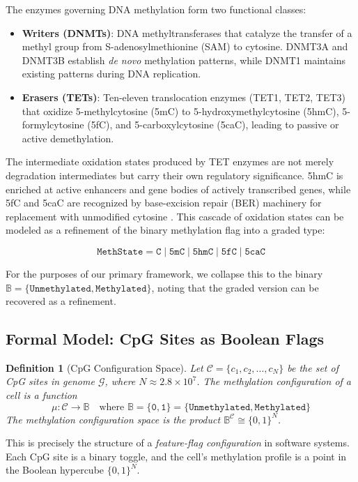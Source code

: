 \documentclass[12pt,a4paper]{article}
\newtheorem{definition}[theorem]{Definition}
\newcommand{\Meth}{\texttt{Methylated}}
\newcommand{\Unmeth}{\texttt{Unmethylated}}
\begin{document}
The enzymes governing DNA methylation form two functional classes:
\begin{itemize}
    \item \textbf{Writers (DNMTs)}: DNA methyltransferases that catalyze the transfer of a methyl group from S-adenosylmethionine (SAM) to cytosine. DNMT3A and DNMT3B establish \emph{de novo} methylation patterns, while DNMT1 maintains existing patterns during DNA replication.
    \item \textbf{Erasers (TETs)}: Ten-eleven translocation enzymes (TET1, TET2, TET3) that oxidize 5-methylcytosine (5mC) to 5-hydroxymethylcytosine (5hmC), 5-formylcytosine (5fC), and 5-carboxylcytosine (5caC), leading to passive or active demethylation.
\end{itemize}

The intermediate oxidation states produced by TET enzymes are not merely degradation intermediates but carry their own regulatory significance. 5hmC is enriched at active enhancers and gene bodies of actively transcribed genes, while 5fC and 5caC are recognized by base-excision repair (BER) machinery for replacement with unmodified cytosine \cite{tahiliani2009}. This cascade of oxidation states can be modeled as a refinement of the binary methylation flag into a graded type:

\[
\texttt{MethState} = \texttt{C} \mid \texttt{5mC} \mid \texttt{5hmC} \mid \texttt{5fC} \mid \texttt{5caC}
\]

For the purposes of our primary framework, we collapse this to the binary $\mathbb{B} = \{\Unmeth, \Meth\}$, noting that the graded version can be recovered as a refinement.

\subsection{Formal Model: CpG Sites as Boolean Flags}

\begin{definition}[CpG Configuration Space]
\label{def:cpg-config}
Let $\mathcal{C} = \{c_1, c_2, \ldots, c_N\}$ be the set of CpG sites in genome $\mathcal{G}$, where $N \approx 2.8 \times 10^7$. The \emph{methylation configuration} of a cell is a function
\[
    \mu : \mathcal{C} \to \mathbb{B} \quad \text{where } \mathbb{B} = \{\texttt{0}, \texttt{1}\} = \{\Unmeth, \Meth\}
\]
The \emph{methylation configuration space} is the product $\mathbb{B}^{\mathcal{C}} \cong \{0,1\}^N$.
\end{definition}

This is precisely the structure of a \emph{feature-flag configuration} in software systems. Each CpG site is a binary toggle, and the cell's methylation profile is a point in the Boolean hypercube $\{0,1\}^N$.
\end{document}
